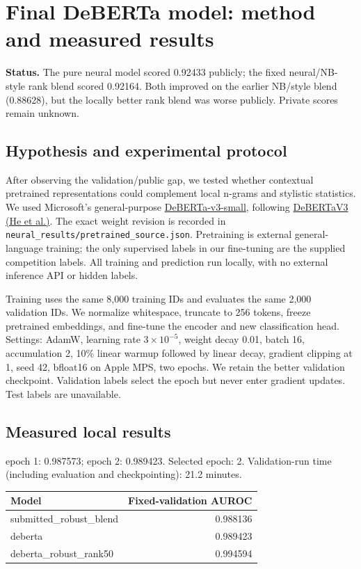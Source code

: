 \newpage
\begingroup\small\setlength{\emergencystretch}{2em}
\section*{Final DeBERTa model: method and measured results}
\textbf{Status.} The pure neural model scored 0.92433 publicly; the fixed neural/NB-style rank blend scored 0.92164. Both improved on the earlier NB/style blend (0.88628), but the locally better rank blend was worse publicly. Private scores remain unknown.

\subsection*{Hypothesis and experimental protocol}
After observing the validation/public gap, we tested whether contextual pretrained representations could complement local n-grams and stylistic statistics. We used Microsoft's general-purpose \href{https://huggingface.co/microsoft/deberta-v3-small}{DeBERTa-v3-small}, following \href{https://arxiv.org/abs/2111.09543}{DeBERTaV3 (He et al.)}. The exact weight revision is recorded in \texttt{neural\_results/pretrained\_source.json}. Pretraining is external general-language training; the only supervised labels in our fine-tuning are the supplied competition labels. All training and prediction run locally, with no external inference API or hidden labels.

Training uses the same 8,000 training IDs and evaluates the same 2,000 validation IDs. We normalize whitespace, truncate to 256 tokens, freeze pretrained embeddings, and fine-tune the encoder and new classification head. Settings: AdamW, learning rate $3\times10^{-5}$, weight decay 0.01, batch 16, accumulation 2, 10\% linear warmup followed by linear decay, gradient clipping at 1, seed 42, bfloat16 on Apple MPS, two epochs. We retain the better validation checkpoint. Validation labels select the epoch but never enter gradient updates. Test labels are unavailable.

\subsection*{Measured local results}
epoch 1: 0.987573; epoch 2: 0.989423. Selected epoch: 2. Validation-run time (including evaluation and checkpointing): 21.2 minutes.


\par\noindent
\begin{tabularx}{\linewidth}{@{}Yr@{}}\toprule
Model & Fixed-validation AUROC\\\midrule
submitted\_robust\_blend & 0.988136 \\
deberta & 0.989423 \\
deberta\_robust\_rank50 & 0.994594 \\
\bottomrule\end{tabularx}\par

